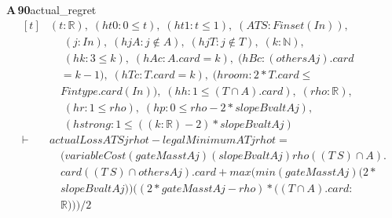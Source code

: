 \documentclass[conference]{IEEEtran}
\theoremstyle{definition}
\newcommand{\lean}[1]{\textsf{\footnotesize #1}}
\begin{document}
\noindent\textbf{A\,90}\quad\lean{actual\_regret}
{\footnotesize\[ \begin{aligned}[t]
&(\mathit{t} : \mathbb{R} ),\; (\mathit{ht0} : 0 \leq \mathit{t}),\; (\mathit{ht1} : \mathit{t} \leq 1),\; (\mathit{A} \mathit{T} \mathit{S} : \mathit{Finset} (\mathit{I} \mathit{n})),\\
&\quad \; (\mathit{j} : \mathit{I} \mathit{n}),\; (\mathit{hjA} : \mathit{j} \notin \mathit{A}),\; (\mathit{hjT} : \mathit{j} \notin \mathit{T}),\; (\mathit{k} : \mathbb{N} ),\\
&\quad \; (\mathit{hk} : 3 \leq \mathit{k}),\; (\mathit{hAc} : \mathit{A}.\mathit{card}=\mathit{k}),\; (\mathit{hBc} : (\mathit{others} \mathit{A} \mathit{j}).\mathit{card}\\
&\quad =\mathit{k}-1),\; (\mathit{hTc} : \mathit{T}.\mathit{card}=\mathit{k}),\; (\mathit{hroom} : 2*\mathit{T}.\mathit{card} \leq\\
&\quad \mathit{Fintype}.\mathit{card} (\mathit{I} \mathit{n})),\; (\mathit{hh} : 1 \leq (\mathit{T} \cap \mathit{A}).\mathit{card}),\; (\mathit{rho} : \mathbb{R} ),\\
&\quad \; (\mathit{hr} : 1 \leq \mathit{rho}),\; (\mathit{hp} : 0 \leq \mathit{rho}-2*\mathit{slopeBval} \mathit{t} \mathit{A} \mathit{j}),\\
&\quad \; (\mathit{hstrong} : 1 \leq ((\mathit{k}:\mathbb{R} )-2)*\mathit{slopeBval} \mathit{t} \mathit{A} \mathit{j})\\
\vdash\;&\mathit{actualLoss} \mathit{A} \mathit{T} \mathit{S} \mathit{j} \mathit{rho} \mathit{t}-\mathit{legalMinimum} \mathit{A} \mathit{T} \mathit{j} \mathit{rho} \mathit{t} =\\
&\quad (\mathit{variableCost} (\mathit{gateMass} \mathit{t} \mathit{A} \mathit{j}) (\mathit{slopeBval} \mathit{t} \mathit{A} \mathit{j}) \mathit{rho} ((\mathit{T} \ \mathit{S}) \cap \mathit{A}).\\
&\quad \mathit{card} ((\mathit{T} \ \mathit{S}) \cap \mathit{others} \mathit{A} \mathit{j}).\mathit{card}+ \mathit{max} (\mathit{min} (\mathit{gateMass} \mathit{t} \mathit{A} \mathit{j}) (2*\\
&\quad \mathit{slopeBval} \mathit{t} \mathit{A} \mathit{j})) ((2*\mathit{gateMass} \mathit{t} \mathit{A} \mathit{j}-\mathit{rho})*((\mathit{T} \cap \mathit{A}).\mathit{card}:\\
&\quad \mathbb{R} )))/2
\end{aligned} \]}
\end{document}
